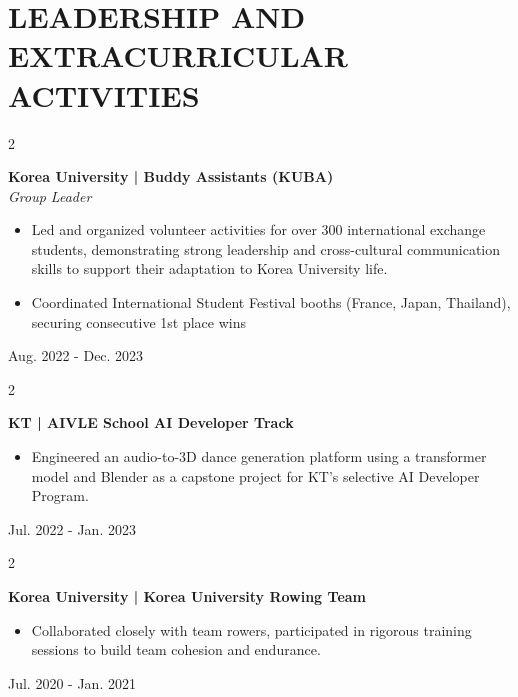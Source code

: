 \documentclass[10pt, letterpaper]{article}
\newenvironment{highlights}{
    \begin{itemize}[
        topsep=0.10 cm,
        parsep=0.10 cm,
        partopsep=0pt,
        itemsep=0pt,
        leftmargin=0 cm + 10pt
    ]
}{
    \end{itemize}
} %
\newenvironment{twocolentry}[2][]{
    \onecolentry
    \def\secondColumn{#2}
    \setcolumnwidth{\fill, 3.5 cm}
    \begin{paracol}{2}
}{
    \switchcolumn \raggedleft \secondColumn
    \end{paracol}
    \endonecolentry
} %
\begin{document}
\section{LEADERSHIP AND EXTRACURRICULAR ACTIVITIES}
        \begin{twocolentry}{
             Aug. 2022 - Dec. 2023\\ 
        }
        \textbf{Korea University | Buddy Assistants (KUBA)}\\
        \textit{Group Leader}
                \begin{highlights}
    \item Led and organized volunteer activities for over 300 international exchange students, demonstrating strong leadership and cross-cultural communication skills to support their adaptation to Korea University life.
    \item Coordinated International Student Festival booths (France, Japan, Thailand), securing consecutive 1st place wins
        \end{highlights}
        \end{twocolentry}

         \vspace{0.05 cm}  

        \begin{twocolentry}{
             Jul. 2022 - Jan. 2023\\ 
        }
        \textbf{KT | AIVLE School AI Developer Track}
        \begin{highlights}
    \item Engineered an audio-to-3D dance generation platform using a transformer model and Blender as a capstone project for KT's selective AI Developer Program.
\end{highlights}
        \end{twocolentry}
         \vspace{0.05 cm}  

        \begin{twocolentry}{
             Jul. 2020 - Jan. 2021\\ 
        }
        \textbf{Korea University | Korea University Rowing Team}
\begin{highlights}
    \item Collaborated closely with team rowers, participated in rigorous training sessions to build team cohesion and endurance.
\end{highlights}
        \end{twocolentry}
         \vspace{0.05 cm}  
\end{document}
